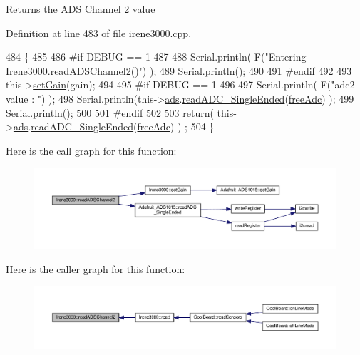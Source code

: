 \begin{DoxyReturn}{Returns}
the A\+DS Channel 2 value 
\end{DoxyReturn}


Definition at line 483 of file irene3000.\+cpp.


\begin{DoxyCode}
484 \{   
485 
486 \textcolor{preprocessor}{#if DEBUG == 1 }
487     
488     Serial.println( F(\textcolor{stringliteral}{"Entering Irene3000.readADSChannel2()"}) );
489     Serial.println();
490 
491 \textcolor{preprocessor}{#endif}
492 
493     this->\hyperlink{class_irene3000_aff7c5da186b388e7272e63ff88a20c34}{setGain}(gain);
494 
495 \textcolor{preprocessor}{#if DEBUG == 1 }
496     
497     Serial.println( F(\textcolor{stringliteral}{"adc2 value : "}) );
498     Serial.println(this->\hyperlink{class_irene3000_a1215e77ba761c9908d80d691f149e135}{ads}.\hyperlink{class_adafruit___a_d_s1015_a40f38b9e1f3ec397c0670dd632510235}{readADC\_SingleEnded}(\hyperlink{_irene3000_8h_a55497513af255250e464ed76543d46d7}{freeAdc}) );
499     Serial.println();
500 
501 \textcolor{preprocessor}{#endif}
502 
503     \textcolor{keywordflow}{return}( this->\hyperlink{class_irene3000_a1215e77ba761c9908d80d691f149e135}{ads}.\hyperlink{class_adafruit___a_d_s1015_a40f38b9e1f3ec397c0670dd632510235}{readADC\_SingleEnded}(\hyperlink{_irene3000_8h_a55497513af255250e464ed76543d46d7}{freeAdc}) ) ;
504 \}
\end{DoxyCode}
Here is the call graph for this function\+:\nopagebreak
\begin{figure}[H]
\begin{center}
\leavevmode
\includegraphics[width=350pt]{d6/d03/class_irene3000_ae73bd2ed14a199a7e83f4d6458476a7c_cgraph}
\end{center}
\end{figure}
Here is the caller graph for this function\+:\nopagebreak
\begin{figure}[H]
\begin{center}
\leavevmode
\includegraphics[width=350pt]{d6/d03/class_irene3000_ae73bd2ed14a199a7e83f4d6458476a7c_icgraph}
\end{center}
\end{figure}
\mbox{\label{class_irene3000_a78a87eb7cf295b95c12b2ebd51c2bb77}} 
